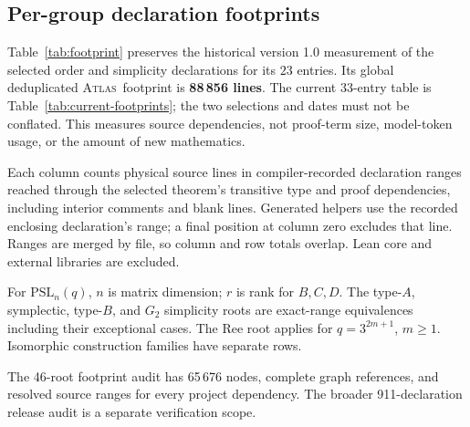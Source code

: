 \documentclass[11pt]{article}
\numberwithin{equation}{section}
\theoremstyle{definition}
\newcommand{\PSL}{\mathrm{PSL}}
\newcommand{\atlas}{\textsc{Atlas}}
\begin{document}
\subsection{Per-group declaration footprints}\label{app:footprints}

Table~\ref{tab:footprint} preserves the historical version 1.0 measurement
of the selected order and simplicity declarations for its $23$ entries.
Its global deduplicated \atlas\ footprint is \textbf{88\,856 lines}.
The current $33$-entry table is Table~\ref{tab:current-footprints}; the
two selections and dates must not be conflated. This measures
source dependencies, not proof-term size, model-token usage, or the
amount of new mathematics.


Each column counts physical source lines in compiler-recorded
declaration ranges reached through the selected theorem's transitive
type and proof dependencies, including interior comments and blank
lines. Generated helpers use the recorded enclosing declaration's
range; a final position at column zero excludes that line. Ranges are
merged by file, so column and row totals overlap. Lean core and external
libraries are excluded.

For $\PSL_n(q)$, $n$ is matrix dimension; $r$ is rank for $B,C,D$.
The type-$A$, symplectic, type-$B$, and $G_2$ simplicity roots are
exact-range equivalences including their exceptional cases. The Ree
root applies for $q=3^{2m+1}$, $m\geq1$. Isomorphic construction
families have separate rows.

The 46-root footprint audit has 65\,676 nodes, complete graph references,
and resolved source ranges for every project dependency. The broader
911-declaration release audit is a separate verification scope.
\end{document}
